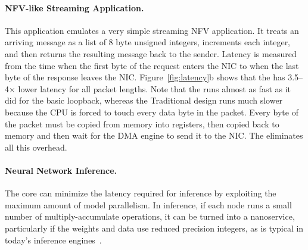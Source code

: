 \paragraph{NFV-like Streaming Application.} This application emulates a very simple streaming NFV application. It treats an arriving message as a list of 8 byte unsigned integers, increments each integer, and then returns the resulting message back to the sender.
Latency is measured from the time when the first byte of the request enters the NIC to when the last byte of the response leaves the NIC.
Figure~\ref{fig:latency}b shows that the \name{} has 3.5--4$\times$ lower latency for all packet lengths. Note that the \name{} runs almost as fast as it did for the basic loopback, whereas the Traditional design runs much slower because the CPU is forced to touch every data byte in the packet. Every byte of the packet must be copied from memory into registers, then copied back to memory and then wait for the DMA engine to send it to the NIC. The \name{} eliminates all this overhead.




\paragraph{Neural Network Inference.} The \name{} core can minimize the latency required for inference by exploiting the maximum amount of model parallelism. In inference, if each node runs a small number of multiply-accumulate operations, it can be turned into a nanoservice, particularly if the weights and data use reduced precision integers, as is typical in today's inference engines~\cite{tpu}.

